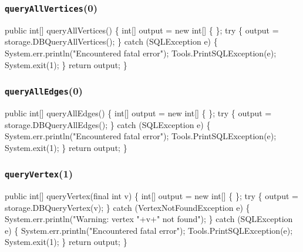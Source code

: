 \documentclass{article}
\def\nwendcode{\endtrivlist \endgroup}      %
\let\nwdocspar=\par
\begin{document}
\subsubsection{{\tt{}\protect{}queryAllVertices}(0)}
\nwenddocs{}\endmoddef{}
public int[] queryAllVertices() \{
  int[] output = new int[] \{ \};
  try \{
    output = storage.DBQueryAllVertices();
  \} catch (SQLException e) \{
    System.err.println("Encountered fatal error");
    Tools.PrintSQLException(e);
    System.exit(1);
  \}
  return output;
\}
\eatline
{}\nwendcode{}\nwdocspar
\subsubsection{{\tt{}\protect{}queryAllEdges}(0)}
\nwenddocs{}\endmoddef{}
public int[] queryAllEdges() \{
  int[] output = new int[] \{ \};
  try \{
    output = storage.DBQueryAllEdges();
  \} catch (SQLException e) \{
    System.err.println("Encountered fatal error");
    Tools.PrintSQLException(e);
    System.exit(1);
  \}
  return output;
\}
\eatline
{}\nwendcode{}\nwdocspar
\subsubsection{{\tt{}queryVertex}(1)}
\nwenddocs{}\endmoddef{}
public int[] queryVertex(final int v) \{
  int[] output = new int[] \{ \};
  try \{
    output = storage.DBQueryVertex(v);
  \} catch (VertexNotFoundException e) \{
    System.err.println("Warning: vertex "+v+" not found");
  \} catch (SQLException e) \{
    System.err.println("Encountered fatal error");
    Tools.PrintSQLException(e);
    System.exit(1);
  \}
  return output;
\}
\nwendcode{}\nwdocspar
\end{document}
